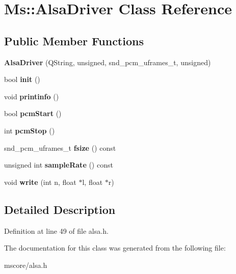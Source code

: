 \hypertarget{class_ms_1_1_alsa_driver}{}\section{Ms\+:\+:Alsa\+Driver Class Reference}
\label{class_ms_1_1_alsa_driver}
\subsection*{Public Member Functions}
\begin{DoxyCompactItemize}
\item 
\mbox{\label{class_ms_1_1_alsa_driver_a0ce32b17f82e1208db619bce1e129fe4}} 
{\bfseries Alsa\+Driver} (Q\+String, unsigned, snd\+\_\+pcm\+\_\+uframes\+\_\+t, unsigned)
\item 
\mbox{\label{class_ms_1_1_alsa_driver_ad10700356b2b4046d3ee8bac69b78005}} 
bool {\bfseries init} ()
\item 
\mbox{\label{class_ms_1_1_alsa_driver_aef6977fda12be79010cfc7218bb23058}} 
void {\bfseries printinfo} ()
\item 
\mbox{\label{class_ms_1_1_alsa_driver_a3b1e612781e213018b68ea9b6baa44e3}} 
bool {\bfseries pcm\+Start} ()
\item 
\mbox{\label{class_ms_1_1_alsa_driver_a8737b5d42b31c51d00661ac699b0e985}} 
int {\bfseries pcm\+Stop} ()
\item 
\mbox{\label{class_ms_1_1_alsa_driver_a552c37798be2053031c399b0aa82ef5b}} 
snd\+\_\+pcm\+\_\+uframes\+\_\+t {\bfseries fsize} () const
\item 
\mbox{\label{class_ms_1_1_alsa_driver_a59ddf595b06d1d1351e2a2f88a5f571e}} 
unsigned int {\bfseries sample\+Rate} () const
\item 
\mbox{\label{class_ms_1_1_alsa_driver_afd055d3f649593b86cf12df026fe2e88}} 
void {\bfseries write} (int n, float $\ast$l, float $\ast$r)
\end{DoxyCompactItemize}


\subsection{Detailed Description}


Definition at line 49 of file alsa.\+h.



The documentation for this class was generated from the following file\+:\begin{DoxyCompactItemize}
\item 
mscore/alsa.\+h\end{DoxyCompactItemize}
